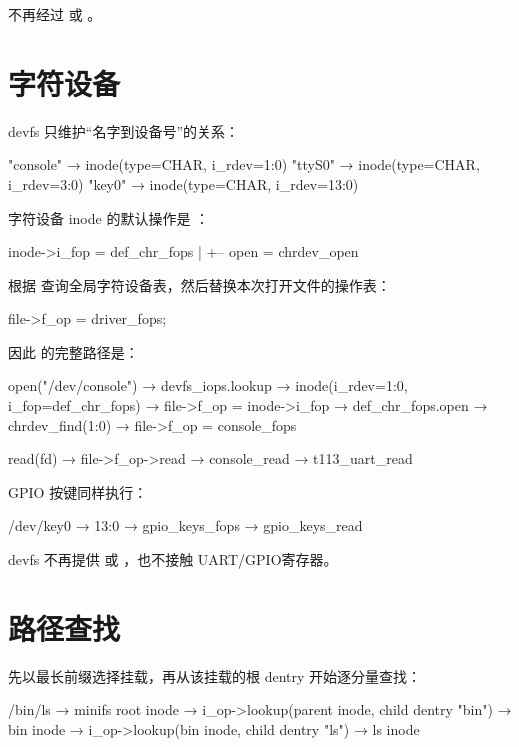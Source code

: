 不再经过  或 。

\section{字符设备}

devfs 只维护“名字到设备号”的关系：

\begin{txtcode}
"console" → inode(type=CHAR, i_rdev=1:0)
"ttyS0"   → inode(type=CHAR, i_rdev=3:0)
"key0"    → inode(type=CHAR, i_rdev=13:0)
\end{txtcode}

字符设备 inode 的默认操作是 ：

\begin{txtcode}
inode->i_fop = def_chr_fops
                   |
                   +-- open = chrdev_open
\end{txtcode}

 根据  查询全局字符设备表，然后替换本次打开文件的操作表：

\begin{ccode}
file->f_op = driver_fops;
\end{ccode}

因此  的完整路径是：

\begin{txtcode}
open("/dev/console")
  → devfs_iops.lookup
  → inode(i_rdev=1:0, i_fop=def_chr_fops)
  → file->f_op = inode->i_fop
  → def_chr_fops.open
  → chrdev_find(1:0)
  → file->f_op = console_fops

read(fd)
  → file->f_op->read
  → console_read
  → t113_uart_read
\end{txtcode}

GPIO 按键同样执行：

\begin{txtcode}
/dev/key0 → 13:0 → gpio_keys_fops → gpio_keys_read
\end{txtcode}

devfs 不再提供  或 ，也不接触 UART/GPIO寄存器。

\section{路径查找}

 先以最长前缀选择挂载，再从该挂载的根 dentry 开始逐分量查找：

\begin{txtcode}
/bin/ls
  → minifs root inode
  → i_op->lookup(parent inode, child dentry "bin")
  → bin inode
  → i_op->lookup(bin inode, child dentry "ls")
  → ls inode
\end{txtcode}

